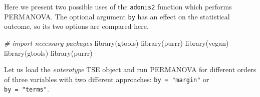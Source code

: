 \documentclass[
]{book}
\newenvironment{Shaded}{\begin{snugshade}}{\end{snugshade}}
\newcommand{\CommentTok}[1]{\textcolor[rgb]{0.56,0.35,0.01}{\textit{#1}}}
\newcommand{\FunctionTok}[1]{\textcolor[rgb]{0.00,0.00,0.00}{#1}}
\newcommand{\NormalTok}[1]{#1}
\begin{document}
Here we present two possible uses of the \texttt{adonis2} function which performs PERMANOVA. The
optional argument \texttt{by} has an effect on the statistical outcome, so its two options are
compared here.

\begin{Shaded}
\begin{Highlighting}[]
\CommentTok{\# import necessary packages}
\FunctionTok{library}\NormalTok{(gtools)}
\FunctionTok{library}\NormalTok{(purrr)}
\FunctionTok{library}\NormalTok{(vegan)}
\FunctionTok{library}\NormalTok{(gtools)}
\FunctionTok{library}\NormalTok{(purrr)}
\end{Highlighting}
\end{Shaded}

Let us load the \emph{enterotype} TSE object and run PERMANOVA for
different orders of three variables with two different approaches:
\texttt{by\ =\ "margin"} or \texttt{by\ =\ "terms"}.
\end{document}
